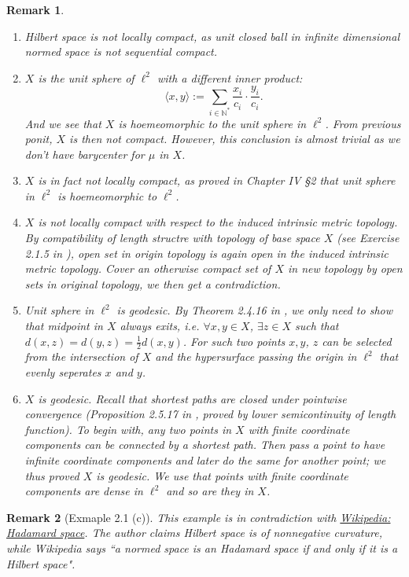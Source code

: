 \documentclass{report}
\newtheorem{rmk}{Remark}
\begin{document}
\begin{rmk}
	\begin{enumerate}
		\item Hilbert space is not locally compact, as unit closed ball in infinite dimensional normed space is not sequential compact.
		\item $X$ is the unit sphere of $\ell^2$ with a different inner product: \[\langle x, y \rangle:=\sum_{i \in \mathbb{N}^*}\frac{x_i}{c_i}\cdot \frac{y_i}{c_i}.\] And we see that $X$ is hoemeomorphic to the unit sphere in $\ell^2$. From previous ponit, $X$ is then not compact. However, this conclusion is almost trivial as we don't have barycenter for $\mu$ in $X$.
		\item $X$ is in fact not locally compact, as proved in \cite{bessaga1975selected} Chapter IV §2 that unit sphere in $\ell^2$ is hoemeomorphic to $\ell^2$.
		\item $X$ is not locally compact with respect to the induced intrinsic metric topology. By compatibility of length structre with topology of base space $X$ (see Exercise 2.1.5 in \cite{burago2001course}), open set in origin topology is again open in the induced intrinsic metric topology. Cover an otherwise compact set of $X$ in new topology by open sets in original topology, we then get a contradiction.
		\item Unit sphere in $\ell^2$ is geodesic. By Theorem 2.4.16 in \cite{burago2001course}, we only need to show that midpoint in $X$ always exits, i.e. $\forall x,y \in X$, $\exists z \in X$ such that $d(x,z)=d(y,z)=\frac{1}{2}d(x,y)$. For such two points $x,y$, $z$ can be selected from the intersection of $X$ and the hypersurface passing the origin in $\ell^2$ that evenly seperates $x$ and $y$.
		\item $X$ is geodesic. Recall that shortest paths are closed under pointwise convergence (Proposition 2.5.17 in \cite{burago2001course}, proved by lower semicontinuity of length function). To begin with, any two points in $X$ with finite coordinate components can be connected by a shortest path. Then pass a point to have infinite coordinate components and later do the same for another point; we thus proved $X$ is geodesic. We use that points with finite coordinate components are dense in $\ell^2$ and so are they in $X$.
	\end{enumerate}
\end{rmk}

\begin{rmk}[Exmaple 2.1 (c)]
	This example is in contradiction with \href{https://en.wikipedia.org/wiki/Hadamard_space}{Wikipedia: Hadamard space}. The author claims Hilbert space is of nonnegative curvature, while Wikipedia says ``a normed space is an Hadamard space if and only if it is a Hilbert space".
\end{rmk}
\end{document}
